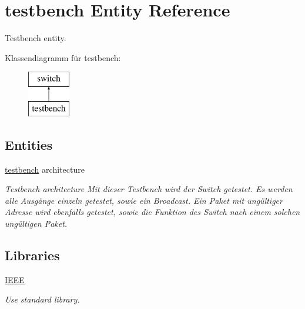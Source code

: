 \hypertarget{classtestbench}{}\section{testbench Entity Reference}
\label{classtestbench}


Testbench entity.  


Klassendiagramm für testbench\+:\begin{figure}[H]
\begin{center}
\leavevmode
\includegraphics[height=2.000000cm]{classtestbench}
\end{center}
\end{figure}
\subsection*{Entities}
\begin{DoxyCompactItemize}
\item 
\mbox{\hyperlink{classtestbench_1_1testbench}{testbench}} architecture
\begin{DoxyCompactList}\small\item\em Testbench architecture Mit dieser Testbench wird der Switch getestet. Es werden alle Ausgänge einzeln getestet, sowie ein Broadcast. Ein Paket mit ungültiger Adresse wird ebenfalls getestet, sowie die Funktion des Switch nach einem solchen ungültigen Paket. \end{DoxyCompactList}\end{DoxyCompactItemize}
\subsection*{Libraries}
 \begin{DoxyCompactItemize}
\item 
\mbox{\label{classtestbench_ae4f03c286607f3181e16b9aa12d0c6d4}} 
\mbox{\hyperlink{classtestbench_ae4f03c286607f3181e16b9aa12d0c6d4}{I\+E\+EE}} 
\begin{DoxyCompactList}\small\item\em Use standard library. \end{DoxyCompactList}\end{DoxyCompactItemize}

